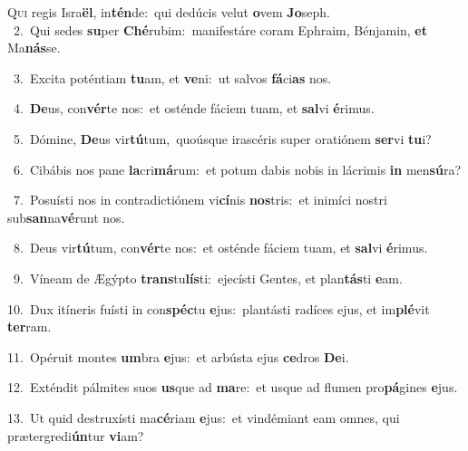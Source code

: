 \lettrine{\initial\textcolor{\initialcolor}{Q}}{ui} regis Isra\-\textbf{ël}\-, in\-\textbf{tén}\-de:~\star qui dedúcis velut \textbf{o}\-vem \textbf{Jo}\-seph.\\
{\numbfont\textcolor{\numbcolor}{~2.}}~Qui sedes \textbf{su}\-per \textbf{Ché}\-rubim:~\star manifestáre coram Ephraim, Bénjamin, \textbf{et} Ma\-\textbf{nás}\-se.\par
{\numbfont\textcolor{\numbcolor}{~3.}}~Excita poténtiam \textbf{tu}\-am, et \textbf{ve}\-ni:~\star ut salvos \textbf{fá}\-ci\textbf{as} nos.\par
{\numbfont\textcolor{\numbcolor}{~4.}}~\-\textbf{De}\-us, con\-\textbf{vér}\-te nos:~\star et osténde fáciem tuam, et \textbf{sal}\-vi \textbf{é}\-rimus.\par
{\numbfont\textcolor{\numbcolor}{~5.}}~Dómine, \textbf{De}\-us vir\-\textbf{tú}\-tum,~\star quoúsque irascéris super oratiónem \textbf{ser}\-vi \textbf{tu}\-i?\par
{\numbfont\textcolor{\numbcolor}{~6.}}~Cibábis nos pane \textbf{la}\-cri\-\textbf{má}\-rum:~\star et potum dabis nobis in lácrimis \textbf{in} men\-\textbf{sú}\-ra?\par
{\numbfont\textcolor{\numbcolor}{~7.}}~Posuísti nos in contradictiónem vi\-\textbf{cí}\-nis \textbf{nos}\-tris:~\star et inimíci nostri sub\-\textbf{san}\-na\-\textbf{vé}\-runt nos.\par
{\numbfont\textcolor{\numbcolor}{~8.}}~Deus vir\-\textbf{tú}\-tum, con\-\textbf{vér}\-te nos:~\star et osténde fáciem tuam, et \textbf{sal}\-vi \textbf{é}\-rimus.\par
{\numbfont\textcolor{\numbcolor}{~9.}}~Víneam de Ægýpto \textbf{trans}\-tu\-\textbf{lís}\-ti:~\star ejecísti Gentes, et plan\-\textbf{tás}\-ti \textbf{e}\-am.\par
{\numbfont\textcolor{\numbcolor}{10.}}~Dux itíneris fuísti in con\-\textbf{spéc}\-tu \textbf{e}\-jus:~\star plantásti radíces ejus, et im\-\textbf{plé}\-vit \textbf{ter}\-ram.\par
{\numbfont\textcolor{\numbcolor}{11.}}~Opéruit montes \textbf{um}\-bra \textbf{e}\-jus:~\star et arbústa ejus \textbf{ce}\-dros \textbf{De}\-i.\par
{\numbfont\textcolor{\numbcolor}{12.}}~Exténdit pálmites suos \textbf{us}\-que ad \textbf{ma}\-re:~\star et usque ad flumen pro\-\textbf{pá}\-gines \textbf{e}\-jus.\par
{\numbfont\textcolor{\numbcolor}{13.}}~Ut quid destruxísti ma\-\textbf{cé}\-riam \textbf{e}\-jus:~\star et vindémiant eam omnes, qui prætergredi\-\textbf{ún}\-tur \textbf{vi}\-am?\par
